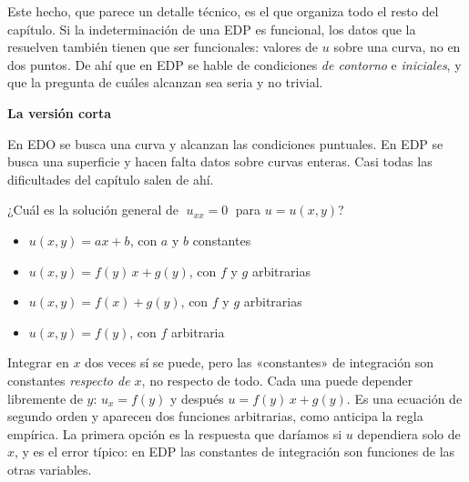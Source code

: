 \documentclass[
  spanish,
  a4paper,
]{scrbook}
\providecommand{\tightlist}{%
  \setlength{\itemsep}{0pt}\setlength{\parskip}{0pt}}
\theoremstyle{definition}
\theoremstyle{plain}
\theoremstyle{definition}
\theoremstyle{plain}
\theoremstyle{definition}
\theoremstyle{remark}
\begin{document}
Este hecho, que parece un detalle técnico, es el que organiza todo el
resto del capítulo. Si la indeterminación de una EDP es funcional, los
datos que la resuelven también tienen que ser funcionales: valores de
\(u\) sobre una curva, no en dos puntos. De ahí que en EDP se hable de
condiciones \emph{de contorno} e \emph{iniciales}, y que la pregunta de
cuáles alcanzan sea seria y no trivial.

\begin{tcolorbox}[enhanced jigsaw, arc=.35mm, bottomrule=.15mm, breakable, colback=white, colframe=quarto-callout-tip-color-frame, left=2mm, leftrule=.75mm, opacityback=0, rightrule=.15mm, toprule=.15mm]
\begin{minipage}[t]{5.5mm}
\textcolor{quarto-callout-tip-color}{\faLightbulb}
\end{minipage}%
\begin{minipage}[t]{\textwidth - 5.5mm}

\vspace{-3mm}\textbf{La versión corta}\vspace{3mm}

En EDO se busca una curva y alcanzan las condiciones puntuales. En EDP
se busca una superficie y hacen falta datos sobre curvas enteras. Casi
todas las dificultades del capítulo salen de ahí.

\end{minipage}%
\end{tcolorbox}

¿Cuál es la solución general de \(\;u_{xx} = 0\;\) para \(u = u(x,y)\)?

\begin{itemize}
\tightlist
\item
  {\(u(x,y) = ax + b\), con \(a\) y \(b\) constantes}
\item
  {\(u(x,y) = f(y)\,x + g(y)\), con \(f\) y \(g\) arbitrarias}
\item
  {\(u(x,y) = f(x) + g(y)\), con \(f\) y \(g\) arbitrarias}
\item
  {\(u(x,y) = f(y)\), con \(f\) arbitraria}
\end{itemize}

Integrar en \(x\) dos veces sí se puede, pero las «constantes» de
integración son constantes \emph{respecto de \(x\)}, no respecto de
todo. Cada una puede depender libremente de \(y\): \(u_x = f(y)\) y
después \(u = f(y)\,x + g(y)\). Es una ecuación de segundo orden y
aparecen dos funciones arbitrarias, como anticipa la regla empírica. La
primera opción es la respuesta que daríamos si \(u\) dependiera solo de
\(x\), y es el error típico: en EDP las constantes de integración son
funciones de las otras variables.
\end{document}
